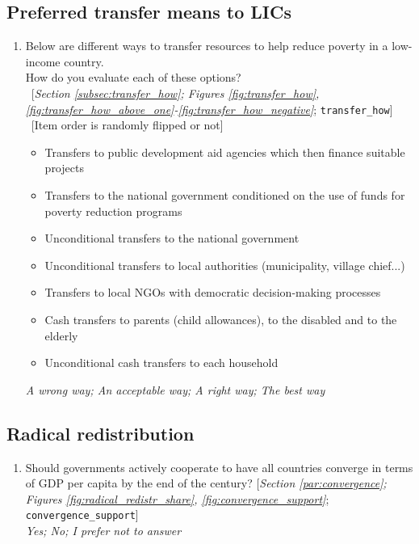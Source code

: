 \documentclass[12pt,english]{article}
\begin{document}
\begin{bibunit}
\begin{enumerate}[resume]
\end{enumerate} 

 \subsection*{Preferred transfer means to LICs} 
 \begin{enumerate}[resume] 
\item  \label{q:transfer_how} Below are different ways to transfer resources to help reduce poverty in a low-income country.~\\How do you evaluate each of these options?\\ 
~[\textit{Section \ref{subsec:transfer_how}; Figures \ref{fig:transfer_how}, \ref{fig:transfer_how_above_one}-\ref{fig:transfer_how_negative}}; 
\verb|transfer_how|]
~[Item order is randomly flipped or not]
\begin{itemize}
  \item Transfers to public development aid agencies which then finance suitable projects
  \item Transfers to the national government conditioned on the use of funds for poverty reduction programs
  \item Unconditional transfers to the national government
  \item Unconditional transfers to local authorities (municipality, village chief...)
  \item Transfers to local NGOs with democratic decision-making processes
  \item Cash transfers to parents (child allowances), to the disabled and to the elderly
  \item Unconditional cash transfers to each household
\end{itemize}
\textit{A wrong way; An acceptable way; A right way; The best way}

\end{enumerate} 

 \subsection*{Radical redistribution} 
 \begin{enumerate}[resume] 
\item  \label{q:convergence_support} Should governments actively cooperate to have all countries converge in terms of GDP per capita by the end of the century? [\textit{Section \ref{par:convergence}; Figures \ref{fig:radical_redistr_share}, \ref{fig:convergence_support}}; 
\verb|convergence_support|]
  \\ \textit{Yes; No; I prefer not to answer}


\end{enumerate}
\end{bibunit}
\end{document}
